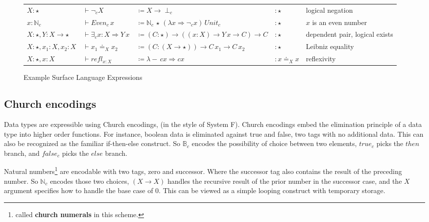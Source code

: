 \begin{sidewaysfigure}
\begin{tabular}{lllll}
$X:\star$ & $\vdash\lnot_{c}X$ & $\coloneqq X\rightarrow\perp_{c}$ & $:\star$ & logical negation\tabularnewline
$x:\mathbb{N}_{c}$ & $\vdash Even_{c}\,x$ & $\coloneqq\mathbb{N}_{c}\,\star\,\left(\lambda x\Rightarrow\lnot_{c}x\right)\,Unit_{c}$ & $:\star$ & $x$ is an even number\tabularnewline
$X:\star,Y:X\rightarrow\star$ & $\vdash\exists_{c}x:X\Rightarrow Y\,x$ & $\coloneqq\left(C:\star\right)\rightarrow\left((x:X)\rightarrow Y\,x\rightarrow C\right)\rightarrow C$ & $:\star$ & dependent pair, logical exists\tabularnewline
$X:\star,x_{1}:X,x_{2}:X$ & $\vdash x_{1}\doteq_{X}x_{2}$ & $\coloneqq\left(C:\left(X\rightarrow\star\right)\right)\rightarrow C\,x_{1}\rightarrow C\,x_{2}$ & $:\star$ & Leibniz equality\tabularnewline
$X:\star,x:X$ & $\vdash refl_{x:X}$ & $\coloneqq\lambda-\,cx\Rightarrow cx$ & $:x\doteq_{X}x$ & reflexivity\tabularnewline
\end{tabular}

\caption{Example Surface Language Expressions}
\label{fig:surface-examples}
\end{sidewaysfigure}

\subsection{Church encodings}

Data types are expressible using Church encodings, (in the style of System F).
Church encodings embed the elimination principle of a data type into higher order functions.
For instance, boolean data is eliminated against true and false, two tags with no additional data.
This can also be recognized as the familiar if-then-else construct. 
So $\mathbb{B}_{c}$ encodes the possibility of choice between two elements, $true_{c}$ picks the $then$ branch, and $false_{c}$ picks the $else$ branch.

Natural numbers\footnote{called \textbf{church numerals} in this scheme.} are encodable with two tags, zero and successor.
Where the successor tag also contains the result of the preceding number.
So $\mathbb{N}_{c}$ encodes those two choices, $(X\rightarrow X)$ handles the recursive result of the prior number in the successor case, and the $X$ argument specifies how to handle the base case of $0$.
This can be viewed as a simple looping construct with temporary storage.

